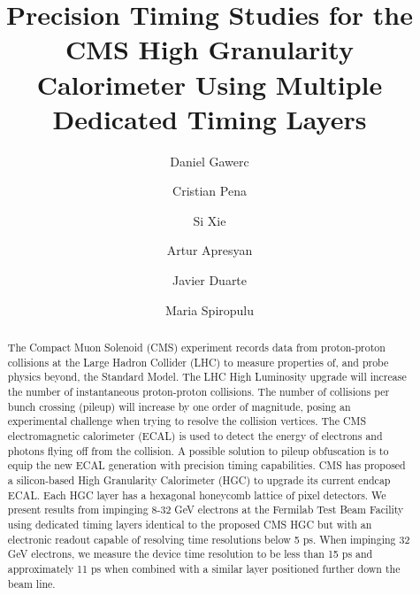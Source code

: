 \documentclass[twocolumn,aps,prd,reprint,superscriptaddress,floatfix]{revtex4-1}
\begin{document}
	\graphicspath{{DanielGawerc/}}
	
	\title{Precision Timing Studies for the CMS High Granularity Calorimeter Using Multiple Dedicated Timing  Layers}
	\author{Daniel Gawerc}
	\author{Cristian Pena}
	\author{Si Xie}
	\author{Artur Apresyan}
	\author{Javier Duarte}
	\author{Maria Spiropulu}


\begin{abstract}
The Compact Muon Solenoid (CMS) experiment records data from proton-proton collisions at the Large Hadron Collider (LHC) to measure properties of, and probe physics beyond, the Standard Model.
The LHC High Luminosity upgrade will increase the number of instantaneous proton-proton collisions.
The number of collisions per bunch crossing (pileup) will increase by one order of magnitude, posing an experimental challenge when trying to resolve the collision vertices.
The CMS electromagnetic calorimeter (ECAL) is used to detect the energy of electrons and photons flying off from the collision.
A possible solution to pileup obfuscation is to equip the new ECAL generation with precision timing capabilities.
CMS has proposed a silicon-based High Granularity Calorimeter (HGC) to upgrade its current endcap ECAL.
Each HGC layer has a hexagonal honeycomb lattice of pixel detectors. We present results from impinging 8-32 GeV electrons at the Fermilab Test Beam Facility using dedicated timing layers identical to the proposed CMS HGC but with an electronic readout capable of resolving time resolutions below 5 ps.
When impinging 32 GeV electrons, we measure the device time resolution to be less than 15 ps and approximately 11 ps when combined with a similar layer positioned further down the beam line.
\end{abstract}

\maketitle
\end{document}
